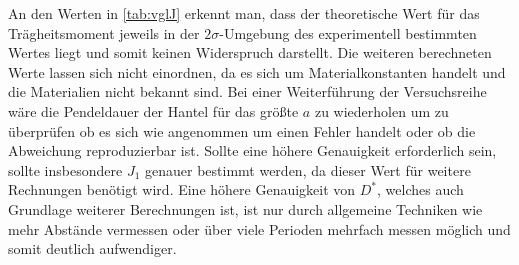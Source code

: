 An den Werten in \cref{tab:vglJ} erkennt man, dass der theoretische Wert für das Trägheitsmoment jeweils in der $2 \sigma$-Umgebung des experimentell bestimmten Wertes liegt und somit keinen Widerspruch darstellt. Die weiteren berechneten Werte lassen sich nicht einordnen, da es sich um Materialkonstanten handelt und die Materialien nicht bekannt sind. Bei einer Weiterführung der Versuchsreihe wäre die Pendeldauer der Hantel für das größte $a$ zu wiederholen um zu überprüfen ob es sich wie angenommen um einen Fehler handelt oder ob die Abweichung reproduzierbar ist. Sollte eine höhere Genauigkeit erforderlich sein, sollte insbesondere $J_1$ genauer bestimmt werden, da dieser Wert für weitere Rechnungen benötigt wird. Eine höhere Genauigkeit von $D^*$, welches auch Grundlage weiterer Berechnungen ist, ist nur durch allgemeine Techniken wie mehr Abstände vermessen oder über viele Perioden mehrfach messen möglich und somit deutlich aufwendiger. 










